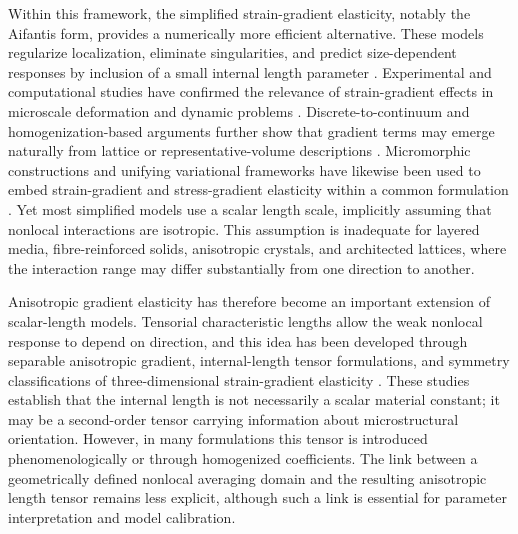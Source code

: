 \documentclass[final,3p,times,fleqn]{elsarticle}
\newcommand{\revtwo}[1]{\textcolor{revtwocolor}{#1}}
\begin{document}
Within this framework, the simplified strain-gradient elasticity, notably the Aifantis form, provides a numerically more efficient alternative. These models regularize localization, eliminate singularities, and predict size-dependent responses by inclusion of a small internal length parameter \cite{Aifantis1992,RuAifantis1993,AltanAifantis1997}. 
Experimental and computational studies have confirmed the relevance of strain-gradient effects in microscale deformation and dynamic problems \cite{Lam2003,AskesAifantis2011}. Discrete-to-continuum and homogenization-based arguments further show that gradient terms may emerge naturally from lattice or representative-volume descriptions \cite{MetrikineAskes2002,Gitman2005}. \revtwo{Micromorphic constructions and unifying variational frameworks have likewise been used to embed strain-gradient and stress-gradient elasticity within a common formulation \cite{Forest2009,Polizzotto2015}.} Yet most simplified models use a scalar length scale, implicitly assuming that nonlocal interactions are isotropic. This assumption is inadequate for layered media, fibre-reinforced solids, anisotropic crystals, and architected lattices, where the interaction range may differ substantially from one direction to another.

Anisotropic gradient elasticity has therefore become an important extension of scalar-length models. Tensorial characteristic lengths allow the weak nonlocal response to depend on direction, and this idea has been developed through separable anisotropic gradient, internal-length tensor formulations, and symmetry classifications of three-dimensional strain-gradient elasticity \cite{LazarPo2015,Polizzotto2018,Auffray2019}. These studies establish that the internal length is not necessarily a scalar material constant; it may be a second-order tensor carrying information about microstructural orientation. However, in many formulations this tensor is introduced phenomenologically or through homogenized coefficients. The link between a geometrically defined nonlocal averaging domain and the resulting anisotropic length tensor remains less explicit, although such a link is essential for parameter interpretation and model calibration.
\end{document}
